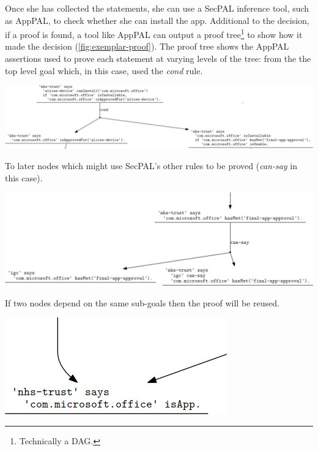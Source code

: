 \documentclass[thesis.tex]{subfiles}
\begin{document}
Once she has collected the statements, she can use a SecPAL inference tool,
such as AppPAL, to check whether she can install the app.  Additional to the
decision, if a proof is found, a tool like AppPAL can output a proof
tree\footnote{Technically a DAG.} to show how it made the decision
(\autoref{fig:exemplar-proof}).  The proof tree shows the AppPAL assertions
used to prove each statement at varying levels of the tree: from the the top
level goal which, in this case, used the \emph{cond} rule.

\begin{center}
  \includegraphics[]{figures/exemplar-proof-1.png}
\end{center}

To later nodes which might use SecPAL's other rules to be proved (\emph{can-say} in this case).

\begin{center}
  \includegraphics[]{figures/exemplar-proof-2.png}
\end{center}

If two nodes depend on the same sub-goals then the proof will be reused.

\begin{center}
  \includegraphics[]{figures/exemplar-proof-3.png}
\end{center}
\end{document}
